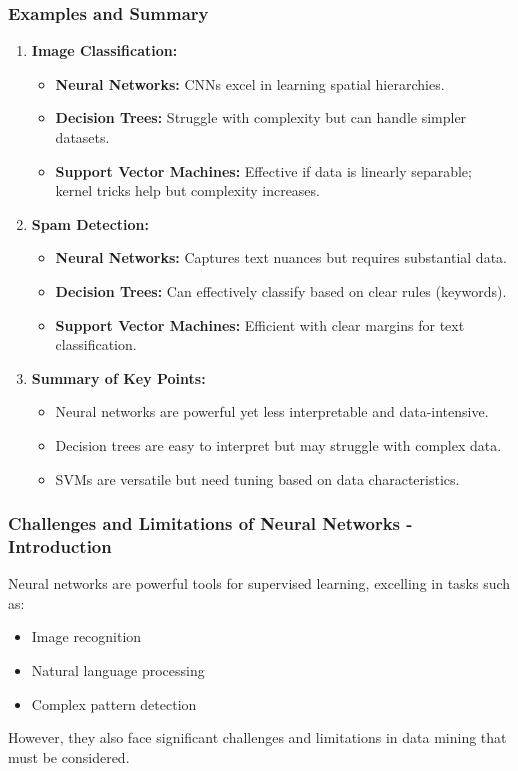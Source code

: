 \documentclass[aspectratio=169]{beamer}
\begin{document}
\begin{frame}[fragile]
    \frametitle{Examples and Summary}
    \begin{enumerate}
        \item \textbf{Image Classification:}
            \begin{itemize}
                \item \textbf{Neural Networks:} CNNs excel in learning spatial hierarchies.
                \item \textbf{Decision Trees:} Struggle with complexity but can handle simpler datasets.
                \item \textbf{Support Vector Machines:} Effective if data is linearly separable; kernel tricks help but complexity increases.
            \end{itemize}
        
        \item \textbf{Spam Detection:}
            \begin{itemize}
                \item \textbf{Neural Networks:} Captures text nuances but requires substantial data.
                \item \textbf{Decision Trees:} Can effectively classify based on clear rules (keywords).
                \item \textbf{Support Vector Machines:} Efficient with clear margins for text classification.
            \end{itemize}
        
        \item \textbf{Summary of Key Points:}
            \begin{itemize}
                \item Neural networks are powerful yet less interpretable and data-intensive.
                \item Decision trees are easy to interpret but may struggle with complex data.
                \item SVMs are versatile but need tuning based on data characteristics.
            \end{itemize}
    \end{enumerate}
\end{frame}

\begin{frame}[fragile]
    \frametitle{Challenges and Limitations of Neural Networks - Introduction}
    Neural networks are powerful tools for supervised learning, excelling in tasks such as:
    \begin{itemize}
        \item Image recognition
        \item Natural language processing
        \item Complex pattern detection
    \end{itemize}
    However, they also face significant challenges and limitations in data mining that must be considered.
\end{frame}
\end{document}
